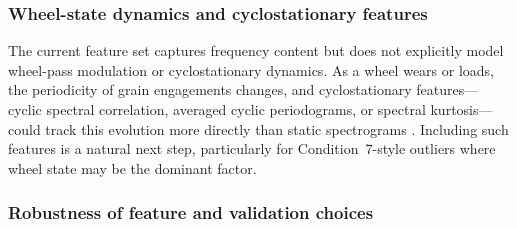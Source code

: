 \subsubsection{Wheel-state dynamics and cyclostationary
features}\label{wheel-state-dynamics}

The current feature set captures frequency content but does not explicitly
model wheel-pass modulation or cyclostationary dynamics. As a wheel wears
or loads, the periodicity of grain engagements changes, and
cyclostationary features---cyclic spectral correlation, averaged cyclic
periodograms, or spectral kurtosis---could track this evolution more
directly than static spectrograms \cite{antoni2007cyclic, antoni2004cyclostationary}.
Including such features is a natural next step, particularly for
Condition~7-style outliers where wheel state may be the dominant factor.

\subsubsection{Robustness of feature and validation
choices}\label{feature-validation-robustness}

